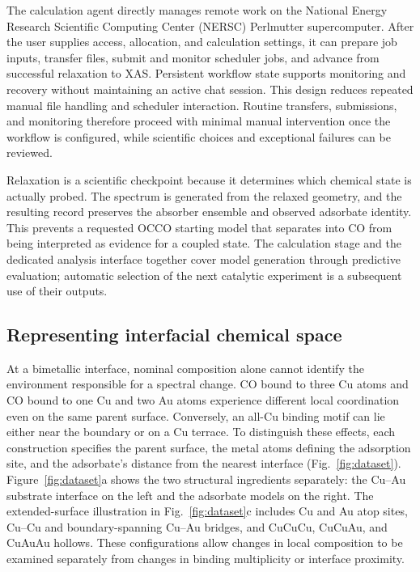 \documentclass[11pt,a4paper]{article}
\begin{document}
The calculation agent directly manages remote work on the National Energy Research Scientific Computing Center (NERSC) Perlmutter supercomputer. After the user supplies access, allocation, and calculation settings, it can prepare job inputs, transfer files, submit and monitor scheduler jobs, and advance from successful relaxation to XAS. Persistent workflow state supports monitoring and recovery without maintaining an active chat session.\cite{nersc} This design reduces repeated manual file handling and scheduler interaction. Routine transfers, submissions, and monitoring therefore proceed with minimal manual intervention once the workflow is configured, while scientific choices and exceptional failures can be reviewed.

Relaxation is a scientific checkpoint because it determines which chemical state is actually probed. The spectrum is generated from the relaxed geometry, and the resulting record preserves the absorber ensemble and observed adsorbate identity. This prevents a requested OCCO starting model that separates into CO from being interpreted as evidence for a coupled state. The calculation stage and the dedicated analysis interface together cover model generation through predictive evaluation; automatic selection of the next catalytic experiment is a subsequent use of their outputs.

\subsection{Representing interfacial chemical space}
At a bimetallic interface, nominal composition alone cannot identify the environment responsible for a spectral change. CO bound to three Cu atoms and CO bound to one Cu and two Au atoms experience different local coordination even on the same parent surface. Conversely, an all-Cu binding motif can lie either near the boundary or on a Cu terrace. To distinguish these effects, each construction specifies the parent surface, the metal atoms defining the adsorption site, and the adsorbate's distance from the nearest interface (Fig.~\ref{fig:dataset}). Figure~\ref{fig:dataset}a shows the two structural ingredients separately: the Cu--Au substrate interface on the left and the adsorbate models on the right. The extended-surface illustration in Fig.~\ref{fig:dataset}c includes Cu and Au atop sites, Cu--Cu and boundary-spanning Cu--Au bridges, and CuCuCu, CuCuAu, and CuAuAu hollows. These configurations allow changes in local composition to be examined separately from changes in binding multiplicity or interface proximity.
\end{document}
